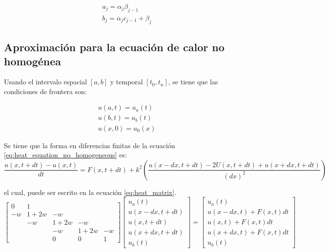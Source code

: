 \begin{align}
    a_j = \alpha_j \beta_{j-1}  \label{eq:a_j} \\
    b_j = \alpha_j c_{j-1} + \beta_j \label{eq:b_j}
\end{align}

\subsection{Aproximación para la ecuación de calor no homogénea}

Usando el intervalo espacial $[a,b]$ y temporal $[t_0,t_n]$, se tiene que las condiciones de frontera son:

\begin{align}
    u(a,t) = u_a(t)  \nonumber \\
    u(b,t) = u_b(t)            \\
    u(x,0) = u_0(x) \nonumber
\end{align}

Se tiene que la forma en diferencias finitas de la ecuación \ref{eq:heat_equation_no_homogeneous} es:
\small
\begin{equation}
    \frac{u(x,t+dt) -u(x,t)}{dt} = F(x,t+dt) + k^2 \left (\frac{u(x-dx,t+dt)-2U(x,t+dt)+u(x+dx,t+dt)}{(dx)^2} \right )
\end{equation}
\normalsize

el cual, puede ser escrito en la ecuación \ref{eq:heat_matrix}.
\scriptsize
\begin{equation}
    \begin{bmatrix}
        0  & 1    &                  \\
        -w & 1+2w & -w               \\
           & -w   & 1+2w & -w        \\
           &      & -w   & 1+2w & -w \\
           &      & 0    & 0    & 1
    \end{bmatrix}
    \begin{bmatrix}
        u_a(t)       \\
        u(x-dx,t+dt) \\
        u(x,t+dt)    \\
        u(x+dx,t+dt) \\
        u_b(t)
    \end{bmatrix} = \begin{bmatrix}
        u_a(t)             \\
        u(x-dx,t)+F(x,t)dt \\
        u(x,t)+F(x,t)dt    \\
        u(x+dx,t)+F(x,t)dt \\
        u_b(t)
    \end{bmatrix} \label{eq:heat_matrix}
\end{equation}
\normalsize

